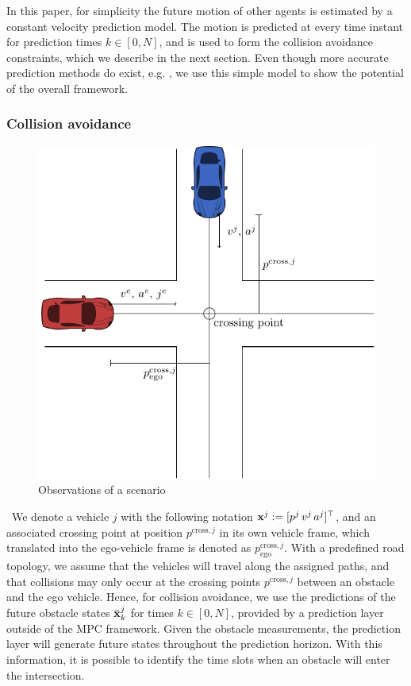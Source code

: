In this paper, for simplicity the future motion of other agents is estimated by a constant velocity prediction model. The motion is predicted at every time instant for prediction times $k\in[0,N]$, and is used to form the collision avoidance constraints, which we describe in the next section. Even though more accurate prediction methods do exist, e.g. \cite{lefevre2014survey,batkovic2018}, we use this simple model to show the potential of the overall framework.

\subsubsection{Collision avoidance}
\begin{figure}[t]
	\centering
	\includegraphics[width=0.6\columnwidth]{figures/figures-observations.pdf}
	\caption{Observations of a scenario}
	\label{fig:observations}
\end{figure}\
We denote a vehicle $j$ with the following notation ${\mathbf{x}}^j:=[p^j\, v^j\, a^j]^\top$, and an associated crossing point at position $p^{\mathrm{cross},j}$ in its own vehicle frame, which translated into the ego-vehicle frame is denoted as $p^{\mathrm{cross},j}_\mathrm{ego}$. With a predefined road topology, we assume that the vehicles will travel along the assigned paths, and that collisions may only occur at the crossing points $p^{\mathrm{cross},j}$ between an obstacle and the ego vehicle. Hence, for collision avoidance, we use the predictions of the future obstacle states $\bar{{\mathbf{x}}}^j_k$ for times $k\in[0,N]$, provided by a prediction layer outside of the MPC framework. Given the obstacle measurements, the prediction layer will generate future states throughout the prediction horizon. With this information, it is possible to identify the time slots when an obstacle will enter the intersection.

